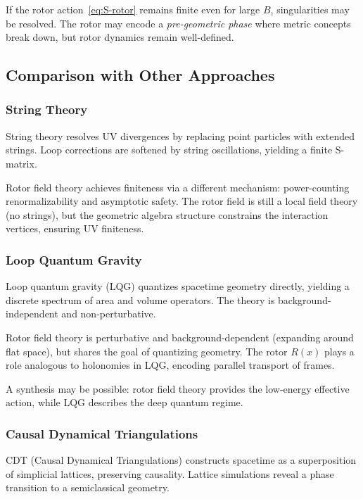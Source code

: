 \documentclass[11pt,a4paper]{article}
\numberwithin{equation}{section}
\theoremstyle{plain}
\theoremstyle{definition}
\theoremstyle{remark}
\begin{document}
If the rotor action~\eqref{eq:S-rotor} remains finite even for large $B$, singularities may be resolved. The rotor may encode a \emph{pre-geometric phase} where metric concepts break down, but rotor dynamics remain well-defined.

\subsection{Comparison with Other Approaches}

\subsubsection{String Theory}

String theory resolves UV divergences by replacing point particles with extended strings. Loop corrections are softened by string oscillations, yielding a finite S-matrix.

Rotor field theory achieves finiteness via a different mechanism: power-counting renormalizability and asymptotic safety. The rotor field is still a local field theory (no strings), but the geometric algebra structure constrains the interaction vertices, ensuring UV finiteness.

\subsubsection{Loop Quantum Gravity}

Loop quantum gravity (LQG) quantizes spacetime geometry directly, yielding a discrete spectrum of area and volume operators. The theory is background-independent and non-perturbative.

Rotor field theory is perturbative and background-dependent (expanding around flat space), but shares the goal of quantizing geometry. The rotor $R(x)$ plays a role analogous to holonomies in LQG, encoding parallel transport of frames.

A synthesis may be possible: rotor field theory provides the low-energy effective action, while LQG describes the deep quantum regime.

\subsubsection{Causal Dynamical Triangulations}

CDT (Causal Dynamical Triangulations) constructs spacetime as a superposition of simplicial lattices, preserving causality. Lattice simulations reveal a phase transition to a semiclassical geometry.
\end{document}
